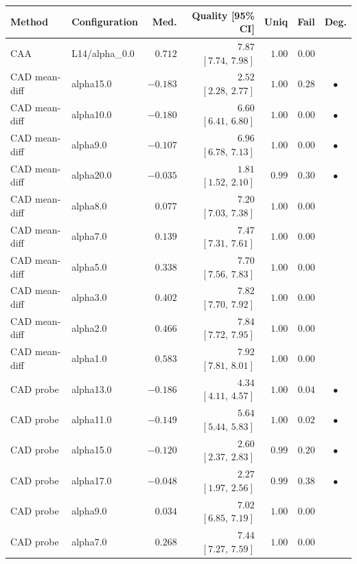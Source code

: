 \begin{table}[t]
\centering\small
\begin{tabular}{llrrrrc}
\toprule
Method & Configuration & Med. & Quality \scriptsize[95\% CI] & Uniq & Fail & Deg. \\
\midrule
CAA & L14/alpha\_0.0 & $0.712$ & $7.87$ \scriptsize$[7.74,\,7.98]$ & $1.00$ & $0.00$ &  \\
CAD mean-diff & alpha15.0 & $-0.183$ & $2.52$ \scriptsize$[2.28,\,2.77]$ & $1.00$ & $0.28$ & $\bullet$ \\
CAD mean-diff & alpha10.0 & $-0.180$ & $6.60$ \scriptsize$[6.41,\,6.80]$ & $1.00$ & $0.00$ & $\bullet$ \\
CAD mean-diff & alpha9.0 & $-0.107$ & $6.96$ \scriptsize$[6.78,\,7.13]$ & $1.00$ & $0.00$ & $\bullet$ \\
CAD mean-diff & alpha20.0 & $-0.035$ & $1.81$ \scriptsize$[1.52,\,2.10]$ & $0.99$ & $0.30$ & $\bullet$ \\
CAD mean-diff & alpha8.0 & $0.077$ & $7.20$ \scriptsize$[7.03,\,7.38]$ & $1.00$ & $0.00$ &  \\
CAD mean-diff & alpha7.0 & $0.139$ & $7.47$ \scriptsize$[7.31,\,7.61]$ & $1.00$ & $0.00$ &  \\
CAD mean-diff & alpha5.0 & $0.338$ & $7.70$ \scriptsize$[7.56,\,7.83]$ & $1.00$ & $0.00$ &  \\
CAD mean-diff & alpha3.0 & $0.402$ & $7.82$ \scriptsize$[7.70,\,7.92]$ & $1.00$ & $0.00$ &  \\
CAD mean-diff & alpha2.0 & $0.466$ & $7.84$ \scriptsize$[7.72,\,7.95]$ & $1.00$ & $0.00$ &  \\
CAD mean-diff & alpha1.0 & $0.583$ & $7.92$ \scriptsize$[7.81,\,8.01]$ & $1.00$ & $0.00$ &  \\
CAD probe & alpha13.0 & $-0.186$ & $4.34$ \scriptsize$[4.11,\,4.57]$ & $1.00$ & $0.04$ & $\bullet$ \\
CAD probe & alpha11.0 & $-0.149$ & $5.64$ \scriptsize$[5.44,\,5.83]$ & $1.00$ & $0.02$ & $\bullet$ \\
CAD probe & alpha15.0 & $-0.120$ & $2.60$ \scriptsize$[2.37,\,2.83]$ & $0.99$ & $0.20$ & $\bullet$ \\
CAD probe & alpha17.0 & $-0.048$ & $2.27$ \scriptsize$[1.97,\,2.56]$ & $0.99$ & $0.38$ & $\bullet$ \\
CAD probe & alpha9.0 & $0.034$ & $7.02$ \scriptsize$[6.85,\,7.19]$ & $1.00$ & $0.00$ &  \\
CAD probe & alpha7.0 & $0.268$ & $7.44$ \scriptsize$[7.27,\,7.59]$ & $1.00$ & $0.00$ &  \\

\end{tabular}
\end{table}

